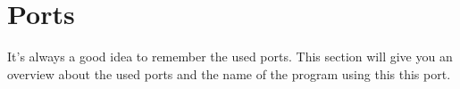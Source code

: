 

\section{Ports}

It's always a good idea to remember the used ports. This section will give
you an overview about the used ports and the name of the program using this
this port.

